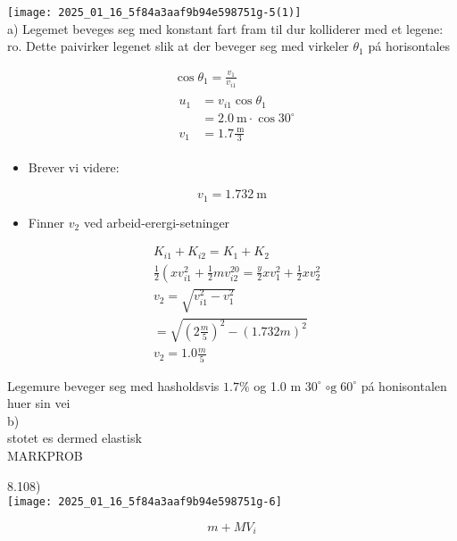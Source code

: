 \documentclass[10pt]{article}
\begin{document}
\texttt{[image: 2025\_01\_16\_5f84a3aaf9b94e598751g-5(1)]}\\
a) Legemet beveges seg med konstant fart fram til dur kolliderer med et legene: ro. Dette paivirker legenet slik at der beveger seg med virkeler $\theta_{1}$ pá horisontales

$$
\begin{aligned}
& \cos \theta_{1}=\frac{v_{1}}{v_{i 1}} \\
& \begin{aligned}
u_{1} & =v_{i 1} \cos \theta_{1} \\
& =2.0 \mathrm{~m} \cdot \cos 30^{\circ} \\
v_{1} & =1.7 \frac{\mathrm{~m}}{3}
\end{aligned}
\end{aligned}
$$

\begin{itemize}
  \item Brever vi videre:
\end{itemize}

$$
v_{1}=1.732 \mathrm{~m}
$$

\begin{itemize}
  \item Finner $v_{2}$ ved arbeid-erergi-setninger
\end{itemize}

$$
\begin{aligned}
& K_{i 1}+K_{i 2}=K_{1}+K_{2} \\
& \frac{1}{2}\left(x v_{i 1}^{2}+\frac{1}{2} m v_{i 2}^{20}=\frac{y}{2} x v_{1}^{2}+\frac{1}{2} x v_{2}^{2}\right. \\
& v_{2}=\sqrt{v_{i 1}^{2}-v_{1}^{2}} \\
& =\sqrt{\left(2 \frac{m}{5}\right)^{2}-(1.732 m)^{2}} \\
& v_{2}=1.0 \frac{m}{5}
\end{aligned}
$$

Legemure beveger seg med hasholdsvis $1.7 \%$ og 1.0 m $30^{\circ} \operatorname{\circ g} 60^{\circ}$ pá honisontalen huer sin vei\\
b)\\
stotet es dermed elastisk\\

MARKPROB

8.108)\\
\texttt{[image: 2025\_01\_16\_5f84a3aaf9b94e598751g-6]}

$$
m+M V_{i}
$$
\end{document}
